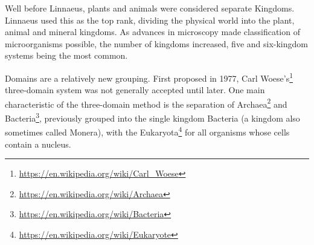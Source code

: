 \documentclass[]{book}
\let\rmarkdownfootnote\footnote%
\def\footnote{\protect\rmarkdownfootnote}
\renewcommand{\href}[2]{#2\footnote{\url{#1}}}
\begin{document}
Well before Linnaeus, plants and animals were considered separate Kingdoms. Linnaeus used this as the top rank, dividing the physical world into the plant, animal and mineral kingdoms. As advances in microscopy made classification of microorganisms possible, the number of kingdoms increased, five and six-kingdom systems being the most common.

Domains are a relatively new grouping. First proposed in 1977, \href{https://en.wikipedia.org/wiki/Carl_Woese}{Carl Woese's} three-domain system was not generally accepted until later. One main characteristic of the three-domain method is the separation of \href{https://en.wikipedia.org/wiki/Archaea}{Archaea} and \href{https://en.wikipedia.org/wiki/Bacteria}{Bacteria}, previously grouped into the single kingdom Bacteria (a kingdom also sometimes called Monera), with the \href{https://en.wikipedia.org/wiki/Eukaryote}{Eukaryota} for all organisms whose cells contain a nucleus.
\end{document}
